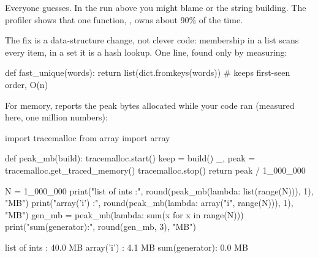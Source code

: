 \begin{boss}
Everyone guesses. In the run above you might blame  or the string building. The
profiler shows that one function, , owns about 90\% of the time.

\begin{center}
\end{center}

The fix is a data-structure change, not clever code: membership in a list scans every item, in a set
it is a hash lookup. One line, found only by measuring:

\begin{pycode}
def fast_unique(words):
    return list(dict.fromkeys(words))     # keeps first-seen order, O(n)
\end{pycode}
\end{boss}

For memory,  reports the peak bytes allocated while your code ran (measured
here, one million numbers):

\begin{pycode}
import tracemalloc
from array import array

def peak_mb(build):
    tracemalloc.start()
    keep = build()
    _, peak = tracemalloc.get_traced_memory()
    tracemalloc.stop()
    return peak / 1_000_000

N = 1_000_000
print("list of ints :", round(peak_mb(lambda: list(range(N))), 1), "MB")
print("array('i')   :", round(peak_mb(lambda: array("i", range(N))), 1), "MB")
gen_mb = peak_mb(lambda: sum(x for x in range(N)))
print("sum(generator):", round(gen_mb, 3), "MB")
\end{pycode}
\begin{rawcode}
list of ints : 40.0 MB
array('i')   : 4.1 MB
sum(generator): 0.0 MB
\end{rawcode}

